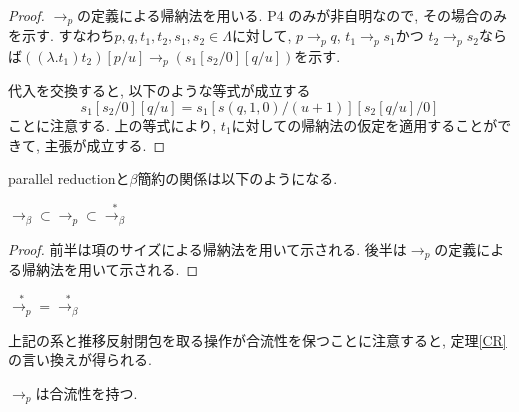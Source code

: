 \documentclass[12pt, titlepage]{ltjsarticle}
\begin{document}
\begin{proof}
 $\rightarrow_{p}$の定義による帰納法を用いる. P4%
のみが非自明なので, その場合のみを示す.
 すなわち$p, q, t_1, t_2, s_1, s_2 \in \Lambda$に対して,
$p \rightarrow_{p} q$, $t_1 \rightarrow_{p} s_1$かつ $t_2 \rightarrow_{p} s_2$ならば$((\lambda. t_1) t_2) [p / u] \rightarrow_{p} (s_1 [s_2 / 0] [q / u])$を示す.

 代入を交換すると, 以下のような等式が成立する
 \[
 s_1 [s_2 / 0][q / u] = s_1 [s(q, 1, 0) / (u + 1)][s_2 [q / u] / 0]
 \]
 ことに注意する. 上の等式により, $t_1$に対しての帰納法の仮定を適用することができて, 主張が成立する.
\end{proof}

parallel reductionと$\beta$簡約の関係は以下のようになる.

\begin{lem}
 $\rightarrow_{\beta} \subset \rightarrow_{p} \subset \overset{*}{\rightarrow_{\beta}}$
\end{lem}

\begin{proof}
 前半は項のサイズによる帰納法を用いて示される. 後半は$\rightarrow_{p}$の定義による帰納法を用いて示される.
\end{proof}

\begin{cor}
 $\overset{*}{\rightarrow_{p}} = \overset{*}{\rightarrow_{\beta}}$
\end{cor}

上記の系と推移反射閉包を取る操作が合流性を保つことに注意すると, 定理\ref{CR}の言い換えが得られる.

\begin{thm}\label{CR'}
 $\rightarrow_{p}$は合流性を持つ.
\end{thm}
\end{document}

